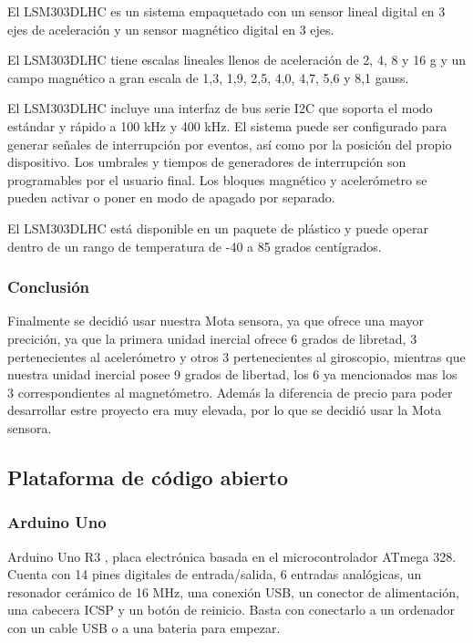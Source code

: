 				El LSM303DLHC es un sistema empaquetado con un sensor lineal digital en 3 ejes de aceleración y un sensor magnético digital en 3 ejes.
				
				El LSM303DLHC tiene escalas lineales llenos de aceleración de 2, 4, 8 y 16 g y un campo magnético a gran escala de 1,3, 1,9, 2,5, 4,0, 4,7, 5,6 y 8,1 gauss.
				
				El LSM303DLHC incluye una interfaz de bus serie I2C que soporta el modo estándar y rápido a 100 kHz y 400 kHz. El sistema puede ser configurado para generar se\~nales de interrupción por eventos, así como por la posición del propio dispositivo. Los umbrales y tiempos de generadores de interrupción son programables por el usuario final. Los bloques magnético y acelerómetro se pueden activar o poner en modo de apagado por separado.
				
				El LSM303DLHC está disponible en un paquete de plástico y puede operar dentro de un rango de temperatura de -40 a 85 grados centígrados.
			
			\subsubsection{Conclusión}
		
				Finalmente se decidió usar nuestra Mota sensora, ya que ofrece una mayor precición, ya que la primera unidad inercial ofrece 6 grados de libretad, 3 pertenecientes al acelerómetro y otros 3 pertenecientes al giroscopio, mientras que nuestra unidad inercial posee 9 grados de libertad, los 6 ya mencionados mas los 3 correspondientes al magnetómetro. Además la diferencia de precio para poder desarrollar estre proyecto era muy elevada, por lo que se decidió usar la Mota sensora.
		
		\subsection{Plataforma de código abierto}
		
		
			\subsubsection{Arduino Uno}
		
				Arduino Uno R3 \cite{ArduinoUno}, placa electrónica basada en el microcontrolador ATmega 328. Cuenta con 14 pines digitales de entrada/salida, 6 entradas analógicas, un resonador cerámico de 16 MHz, una conexión USB, un conector de alimentación, una cabecera ICSP y un botón de reinicio. Basta con conectarlo a un ordenador con un cable USB o a una bateria para empezar.
				
